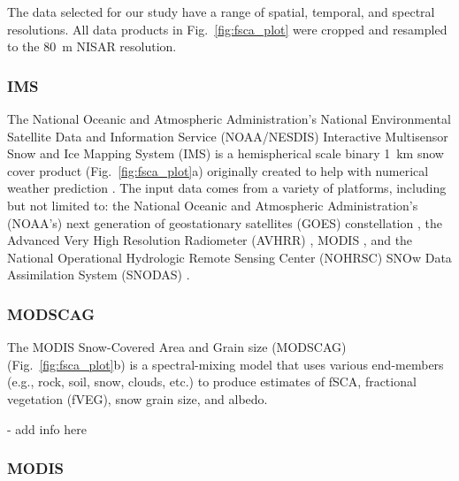 The data selected for our study have a range of spatial, temporal, and spectral resolutions. All data products in Fig.~\ref{fig:fsca_plot} were cropped and resampled to the 80~m NISAR resolution.  

\clearpage
\hypertarget{ch4-methods-3}{\subsubsection{IMS}\label{ch4-methods-3}}

The National Oceanic and Atmospheric Administration’s National Environmental Satellite Data and Information Service (NOAA/NESDIS) Interactive Multisensor Snow and Ice Mapping System (IMS) is a hemispherical scale binary 1~km snow cover product (Fig.~\ref{fig:fsca_plot}a) originally created to help with numerical weather prediction 
\citep{ramsayInteractiveMultisensorSnow1998, helfrichEnhancementsForthcomingDevelopments2007}. The input data comes from a variety of platforms, including but not limited to: the National Oceanic and Atmospheric Administration's (NOAA's) next generation of geostationary satellites (GOES) constellation \citep{menzelIntroducingGOESIFirst1994}, the Advanced Very High Resolution Radiometer (AVHRR) \citep{cracknellAdvancedVeryHigh1997}, MODIS \citep{salomonsonMODISAdvancedFacility1989}, and the National Operational Hydrologic Remote Sensing Center (NOHRSC) SNOw Data Assimilation System (SNODAS) \citep{barrettandrewNationalOperationalHydrologic2003}.

\hypertarget{ch4-methods-4}{\subsubsection{MODSCAG}\label{ch4-methods-4}}


The MODIS Snow-Covered Area and Grain size (MODSCAG) (Fig.~\ref{fig:fsca_plot}b) \citep{painterRetrievalSubpixelSnow2009} is a spectral-mixing model that uses various end-members (e.g., rock, soil, snow, clouds, etc.) to produce estimates of fSCA, fractional vegetation (fVEG), snow grain size, and albedo.

- add info here

\hypertarget{ch4-methods-5}{\subsubsection{MODIS}\label{ch4-methods-5}}

